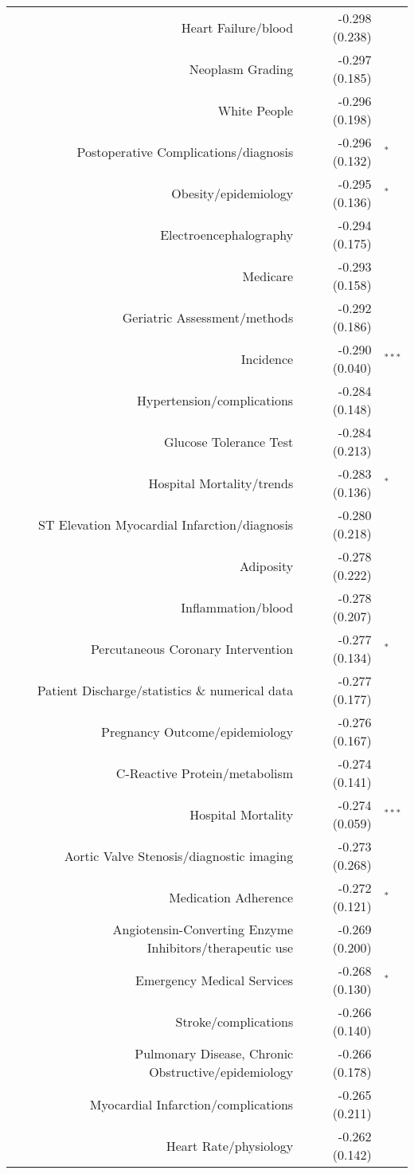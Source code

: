 \begin{longtable}[l]{rr@{}l@{ }}
Heart Failure/blood & -0.298 (0.238) & $^{}$\\
Neoplasm Grading & -0.297 (0.185) & $^{}$\\
White People & -0.296 (0.198) & $^{}$\\
Postoperative Complications/diagnosis & -0.296 (0.132) & $^{*}$\\
Obesity/epidemiology & -0.295 (0.136) & $^{*}$\\
Electroencephalography & -0.294 (0.175) & $^{}$\\
Medicare & -0.293 (0.158) & $^{}$\\
Geriatric Assessment/methods & -0.292 (0.186) & $^{}$\\
Incidence & -0.290 (0.040) & $^{***}$\\
Hypertension/complications & -0.284 (0.148) & $^{}$\\
Glucose Tolerance Test & -0.284 (0.213) & $^{}$\\
Hospital Mortality/trends & -0.283 (0.136) & $^{*}$\\
ST Elevation Myocardial Infarction/diagnosis & -0.280 (0.218) & $^{}$\\
Adiposity & -0.278 (0.222) & $^{}$\\
Inflammation/blood & -0.278 (0.207) & $^{}$\\
Percutaneous Coronary Intervention & -0.277 (0.134) & $^{*}$\\
Patient Discharge/statistics \& numerical data & -0.277 (0.177) & $^{}$\\
Pregnancy Outcome/epidemiology & -0.276 (0.167) & $^{}$\\
C-Reactive Protein/metabolism & -0.274 (0.141) & $^{}$\\
Hospital Mortality & -0.274 (0.059) & $^{***}$\\
Aortic Valve Stenosis/diagnostic imaging & -0.273 (0.268) & $^{}$\\
Medication Adherence & -0.272 (0.121) & $^{*}$\\
Angiotensin-Converting Enzyme Inhibitors/therapeutic use & -0.269 (0.200) & $^{}$\\
Emergency Medical Services & -0.268 (0.130) & $^{*}$\\
Stroke/complications & -0.266 (0.140) & $^{}$\\
Pulmonary Disease, Chronic Obstructive/epidemiology & -0.266 (0.178) & $^{}$\\
Myocardial Infarction/complications & -0.265 (0.211) & $^{}$\\
Heart Rate/physiology & -0.262 (0.142) & $^{}$\\

\end{longtable}
